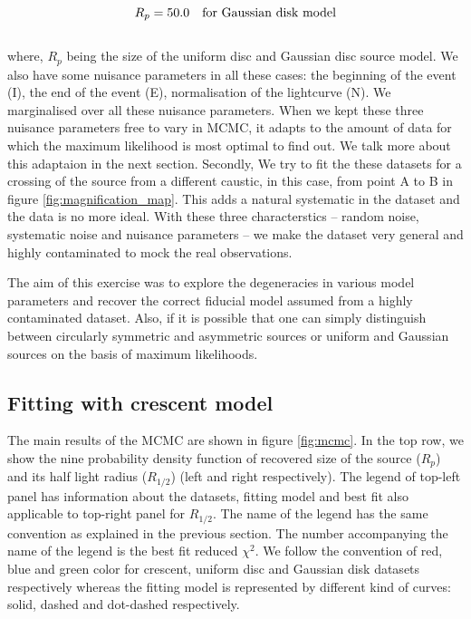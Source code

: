 \begin{equation}
	R_p = 50.0 \ \ \ \rm{for\ Gaussian\ disk\ model}
\end{equation}
\\
where, $R_p$ being the size of the uniform disc and Gaussian disc source model. We also have some nuisance parameters in all these cases: the beginning of the event (I), the end of the event (E), normalisation of the lightcurve (N). We marginalised over all these nuisance parameters. When we kept these three nuisance parameters free to vary in MCMC, it adapts to the amount of data for which the maximum likelihood is most optimal to find out. We talk more about this adaptaion in the next section. Secondly, We try to fit the these datasets for a crossing of the source from a different caustic, in this case, from point A to B in figure \ref{fig:magnification_map}. This adds a natural systematic in the dataset and the data is no more ideal. With these three characterstics -- random noise, systematic noise and nuisance parameters -- we make the dataset very general and highly contaminated to mock the real observations.

The aim of this exercise was to explore the degeneracies in  various model parameters and recover the correct fiducial model assumed from a highly contaminated dataset. Also, if it is possible that one can simply distinguish between circularly symmetric and asymmetric sources or uniform and Gaussian sources on the basis of maximum likelihoods. 

\subsection{Fitting with crescent model}

The main results of the MCMC are shown in figure \ref{fig:mcmc}. In the top row, we show the nine probability density function of recovered size of the source ($R_p$) and its half light radius ($R_{1/2}$) (left and right respectively). The legend of top-left panel has information about the datasets, fitting model and best fit also applicable to top-right panel for $R_{1/2}$. The name of the legend has the same convention as explained in the previous section. The number accompanying the name of the legend is the best fit reduced $\chi^2$. We follow the convention of red, blue and green color for crescent, uniform disc and Gaussian disk datasets respectively whereas the fitting model is represented by different kind of curves: solid, dashed and dot-dashed respectively.



